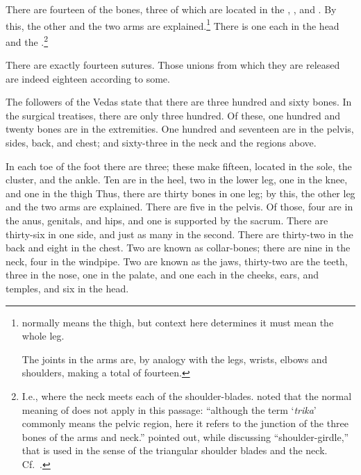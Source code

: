 \begin{translation}
There are fourteen  of the bones, three of which
are located in the , , and
.  By this, the other  and the two
arms are explained.\footnote{ normally means the thigh,
    but context here determines it must mean the whole leg. 
    
    The joints in the arms are, by analogy with the legs, wrists, elbows and 
    shoulders, making a total of fourteen.} There is one
    each in the head and the .\footnote{I.e.,
        where the neck meets each of the shoulder-blades.
         noted that the normal meaning of 
        does not apply in this passage: 
        “although the term `\emph{trika}' commonly means the pelvic region,
        here it refers to the junction of the three bones of the arms and
        neck.” \citet[135--136, 140, 230--232]{hoer-1907} pointed out, while
        discussing  “shoulder-girdle,” that 
        is used in the sense of the triangular shoulder blades and the neck.
        Cf.\ \cite[386]{josi-maha}.}

\newpage
\gottohere %

\item[17]
There are exactly fourteen sutures. 
Those unions from which they are released are indeed eighteen according to some. 



\item[18]
The followers of the Vedas state that there are three hundred and sixty bones. In the surgical treatises, there are only three hundred. Of these, one hundred and twenty bones are in the extremities.  One hundred and seventeen are in the pelvis, sides, back, and chest; and sixty-three in the neck and the regions above. 

\item[19]
In each toe of the foot there are three; these make fifteen, located in the sole, the cluster, and the ankle. Ten are in the heel, two in the lower leg, one in the knee, and one in the thigh Thus, there are thirty bones in one leg; by this, the other leg and the two arms are explained.  There are five in the pelvis.  Of those, four are in the anus, genitals, and hips, and one is supported by the sacrum.  There are thirty-six in one side, and just as many in the second. There are thirty-two in the back and eight in the chest. Two are known as collar-bones; there are nine in the neck, four in the windpipe.  Two are known as the jaws, thirty-two are the teeth, three in the nose, one in the palate, and one each in the cheeks, ears, and temples, and six in the head. 


\end{translation}
